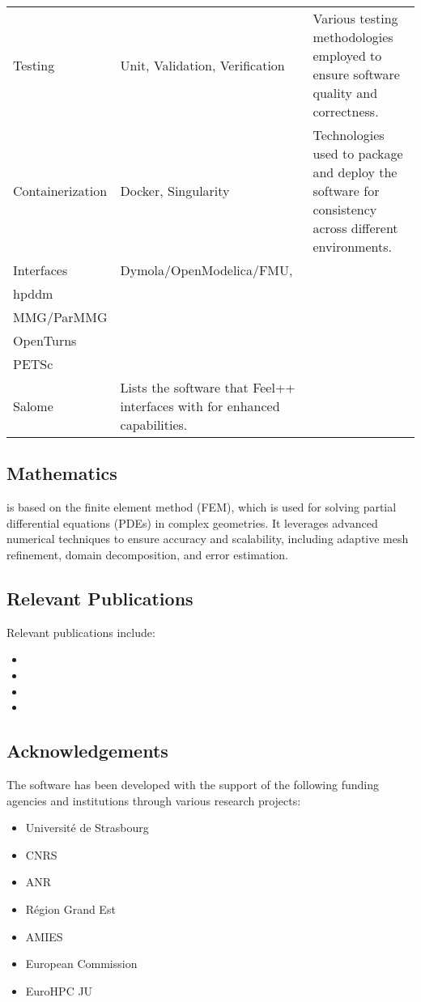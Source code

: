 \begin{longtable}{lp{}p{}}
        \rowcolor{white}Testing  & Unit, Validation, Verification & Various testing methodologies employed to ensure software quality and correctness. \\
        
        \rowcolor{numpexlightergray}Containerization  & Docker, Singularity & Technologies used to package and deploy the software for consistency across different environments. \\
        
        \rowcolor{white}Interfaces  & Dymola/OpenModelica/FMU,\\ hpddm\\ MMG/ParMMG\\
        OpenTurns\\
        PETSc\\
        Salome& Lists the software that Feel++ interfaces with for enhanced capabilities. \\

    \end{longtable}
    

\subsection{Mathematics}
\label{sec:Feelpp:mathematics}
\Feelpp is based on the finite element method (FEM), which is used for solving partial differential equations (PDEs) in complex geometries. 
It leverages advanced numerical techniques to ensure accuracy and scalability, including adaptive mesh refinement, domain decomposition, and error estimation.

\subsection{Relevant Publications}
\label{sec:Feelpp:publications}
Relevant publications include:
\begin{itemize}
    \item {}
    \item {}
    \item {}
    \item {}
\end{itemize}

\subsection{Acknowledgements}
\label{sec::Feelpp:acknowledgements}
The software has been developed with the support of the following funding agencies and institutions through various research projects: 
\begin{itemize}
   \item Université de Strasbourg
   \item CNRS
   \item ANR
   \item Région Grand Est
   \item AMIES
   \item European Commission
   \item EuroHPC JU
\end{itemize}
